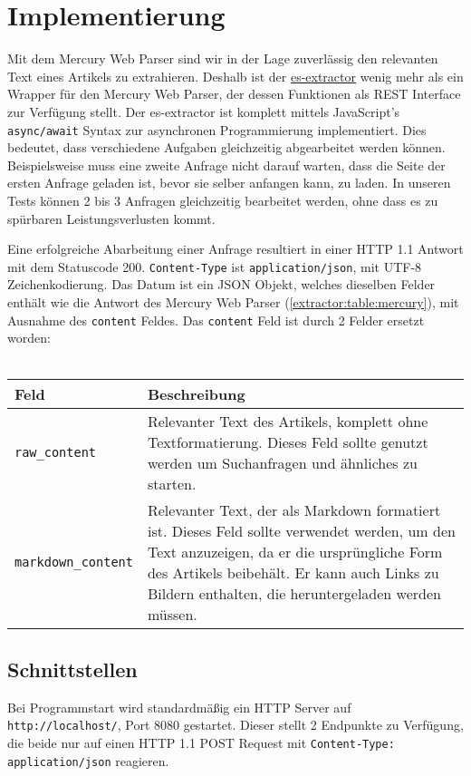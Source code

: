 \section{Implementierung} \label{extractor:sec:impl}
Mit dem Mercury Web Parser sind wir in der Lage zuverlässig den relevanten Text eines Artikels zu extrahieren.
Deshalb ist der \hyperref{https://github.com/elastifeed/es-extractor/}{}{}{es-extractor} wenig mehr als ein Wrapper für den Mercury Web Parser, der dessen Funktionen als REST Interface zur Verfügung stellt. Der es-extractor ist komplett mittels JavaScript's \texttt{async/await} Syntax zur asynchronen Programmierung implementiert. Dies bedeutet, dass verschiedene Aufgaben gleichzeitig abgearbeitet werden können. Beispielsweise muss eine zweite Anfrage nicht darauf warten, dass die Seite der ersten Anfrage geladen ist, bevor sie selber anfangen kann, zu laden. In unseren Tests können 2 bis 3 Anfragen gleichzeitig bearbeitet werden, ohne dass es zu spürbaren Leistungsverlusten kommt. \par
Eine erfolgreiche Abarbeitung einer Anfrage resultiert in einer HTTP 1.1 Antwort mit dem Statuscode 200. \verb|Content-Type| ist \verb|application/json|, mit UTF-8 Zeichenkodierung. Das Datum ist ein \ac{JSON} Objekt, welches dieselben Felder enthält wie die Antwort des Mercury Web Parser (\autoref{extractor:table:mercury}), mit Ausnahme des \verb|content| Feldes. Das \verb|content| Feld ist durch 2 Felder ersetzt worden: \\ \\
	\begin{tabu}{lX}
		\toprule
		Feld & Beschreibung \\ \midrule
		\texttt{raw\_content} & Relevanter Text des Artikels, komplett ohne Textformatierung. Dieses Feld sollte genutzt werden um Suchanfragen und ähnliches zu starten. \\
		\midrule
		\texttt{markdown\_content} & Relevanter Text, der als Markdown \cite{markdown2016} formatiert ist. Dieses Feld sollte verwendet werden, um den Text anzuzeigen, da er die ursprüngliche Form des Artikels beibehält. Er kann auch Links zu Bildern enthalten, die heruntergeladen werden müssen. \\
		\bottomrule
	\end{tabu}

\subsection{Schnittstellen}
Bei Programmstart wird standardmäßig ein HTTP Server auf \verb|http://localhost/|, Port 8080 gestartet. Dieser stellt 2 Endpunkte zu Verfügung, die beide nur auf einen HTTP 1.1 POST Request mit \verb|Content-Type: application/json| reagieren. 
